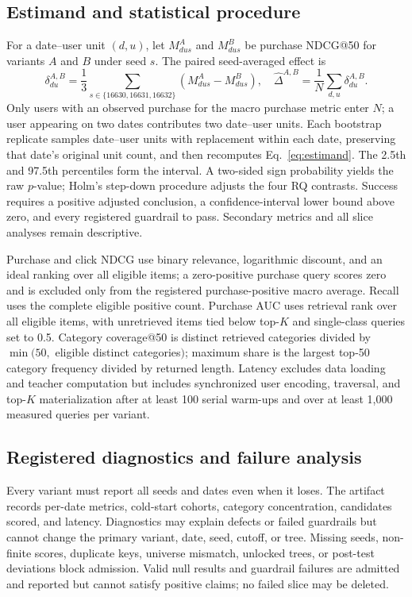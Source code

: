 \documentclass[sigconf,natbib=true]{acmart}
\begin{document}
\subsection{Estimand and statistical procedure}
For a date--user unit $(d,u)$, let $M_{dus}^{A}$ and $M_{dus}^{B}$ be purchase NDCG@50 for variants $A$ and $B$ under seed $s$. The paired seed-averaged effect is
\begin{equation}
\delta_{du}^{A,B}=\frac{1}{3}\sum_{s\in\{16630,16631,16632\}}
\left(M_{dus}^{A}-M_{dus}^{B}\right),
\quad
\widehat{\Delta}^{A,B}=\frac{1}{N}\sum_{d,u}\delta_{du}^{A,B}.
\label{eq:estimand}
\end{equation}
Only users with an observed purchase for the macro purchase metric enter $N$; a user appearing on two dates contributes two date--user units. Each bootstrap replicate samples date--user units with replacement within each date, preserving that date's original unit count, and then recomputes Eq.~\ref{eq:estimand}. The 2.5th and 97.5th percentiles form the interval. A two-sided sign probability yields the raw $p$-value; Holm's step-down procedure adjusts the four RQ contrasts. Success requires a positive adjusted conclusion, a confidence-interval lower bound above zero, and every registered guardrail to pass. Secondary metrics and all slice analyses remain descriptive.

Purchase and click NDCG use binary relevance, logarithmic discount, and an ideal ranking over all eligible items; a zero-positive purchase query scores zero and is excluded only from the registered purchase-positive macro average. Recall uses the complete eligible positive count. Purchase AUC uses retrieval rank over all eligible items, with unretrieved items tied below top-$K$ and single-class queries set to 0.5. Category coverage@50 is distinct retrieved categories divided by $\min(50,$ eligible distinct categories$)$; maximum share is the largest top-50 category frequency divided by returned length. Latency excludes data loading and teacher computation but includes synchronized user encoding, traversal, and top-$K$ materialization after at least 100 serial warm-ups and over at least 1,000 measured queries per variant.

\subsection{Registered diagnostics and failure analysis}
Every variant must report all seeds and dates even when it loses. The artifact records per-date metrics, cold-start cohorts, category concentration, candidates scored, and latency. Diagnostics may explain defects or failed guardrails but cannot change the primary variant, date, seed, cutoff, or tree. Missing seeds, non-finite scores, duplicate keys, universe mismatch, unlocked trees, or post-test deviations block admission. Valid null results and guardrail failures are admitted and reported but cannot satisfy positive claims; no failed slice may be deleted.
\end{document}
